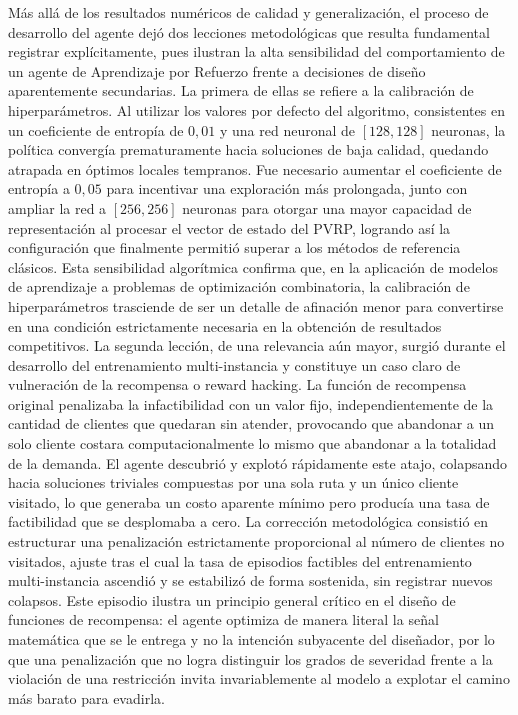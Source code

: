 Más allá de los resultados numéricos de calidad y generalización, el proceso de desarrollo del agente dejó dos lecciones metodológicas que resulta fundamental registrar explícitamente, pues ilustran la alta sensibilidad del comportamiento de un agente de Aprendizaje por Refuerzo frente a decisiones de diseño aparentemente secundarias. La primera de ellas se refiere a la calibración de hiperparámetros. Al utilizar los valores por defecto del algoritmo, consistentes en un coeficiente de entropía de $0{,}01$ y una red neuronal de $[128, 128]$ neuronas, la política convergía prematuramente hacia soluciones de baja calidad, quedando atrapada en óptimos locales tempranos. Fue necesario aumentar el coeficiente de entropía a $0{,}05$ para incentivar una exploración más prolongada, junto con ampliar la red a $[256, 256]$ neuronas para otorgar una mayor capacidad de representación al procesar el vector de estado del PVRP, logrando así la configuración que finalmente permitió superar a los métodos de referencia clásicos. Esta sensibilidad algorítmica confirma que, en la aplicación de modelos de aprendizaje a problemas de optimización combinatoria, la calibración de hiperparámetros trasciende de ser un detalle de afinación menor para convertirse en una condición estrictamente necesaria en la obtención de resultados competitivos. La segunda lección, de una relevancia aún mayor, surgió durante el desarrollo del entrenamiento multi-instancia y constituye un caso claro de vulneración de la recompensa o reward hacking. La función de recompensa original penalizaba la infactibilidad con un valor fijo, independientemente de la cantidad de clientes que quedaran sin atender, provocando que abandonar a un solo cliente costara computacionalmente lo mismo que abandonar a la totalidad de la demanda. El agente descubrió y explotó rápidamente este atajo, colapsando hacia soluciones triviales compuestas por una sola ruta y un único cliente visitado, lo que generaba un costo aparente mínimo pero producía una tasa de factibilidad que se desplomaba a cero. La corrección metodológica consistió en estructurar una penalización estrictamente proporcional al número de clientes no visitados, ajuste tras el cual la tasa de episodios factibles del entrenamiento multi-instancia ascendió y se estabilizó de forma sostenida, sin registrar nuevos colapsos. Este episodio ilustra un principio general crítico en el diseño de funciones de recompensa: el agente optimiza de manera literal la señal matemática que se le entrega y no la intención subyacente del diseñador, por lo que una penalización que no logra distinguir los grados de severidad frente a la violación de una restricción invita invariablemente al modelo a explotar el camino más barato para evadirla.

